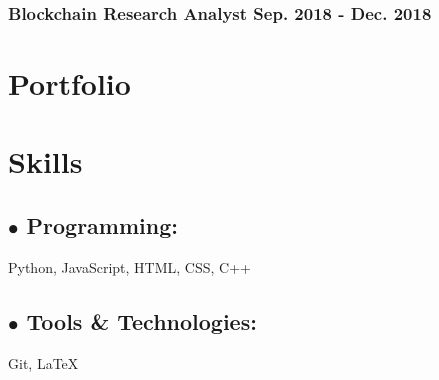 \documentclass{article}
\begin{document}
\subsubsection{Blockchain Research Analyst \hspace{4.3in} Sep. 2018 - Dec. 2018}


\section{Portfolio}


\section{Skills}

\subsection{$\bullet$ Programming:  }

Python, JavaScript, HTML, CSS, C++

\subsection{$\bullet$ Tools \& Technologies:}

Git, {\LaTeX}
\end{document}
